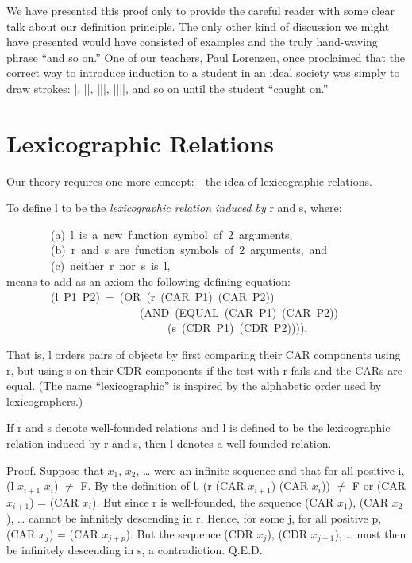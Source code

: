 \documentclass[10pt]{book}
\newenvironment{pubasis}{\begin{flushleft}}{\end{flushleft}}
\begin{document}
We have presented this proof only to provide
the careful reader with some clear talk about our
definition principle.  The only other kind
of discussion we might have presented would
have consisted of examples and the truly
hand-waving phrase ``and so on.''  One of our
teachers,  Paul Lorenzen, once proclaimed
that the correct way to introduce induction
to a student in an ideal society
was simply to draw strokes: |, ||, |||, ||||, 
and so on until the student ``caught on.''

\section{Lexicographic Relations}
\label{SSLEX}
Our theory requires one more concept:~~the
idea of lexicographic relations.

\hrulefill 

To define l to be the \emph{lexicographic relation induced by} r and s, where:
\begin{pubasis}
~~~~~~~~(a)~l~is~a~new~function~symbol~of~2~arguments,\\
~~~~~~~~(b)~r~and~s~are~function~symbols~of~2~arguments,~and\\
~~~~~~~~(c)~neither~r~nor~s~is~l,\\

means to add as an axiom the following defining equation:\\

~~~~~~~~(l~P1~P2)~=~(OR~(r~(CAR~P1)~(CAR~P2))\\
~~~~~~~~~~~~~~~~~~~~~~~~(AND~(EQUAL~(CAR~P1)~(CAR~P2))\\
~~~~~~~~~~~~~~~~~~~~~~~~~~~~~(s~(CDR~P1)~(CDR~P2)))).\\
\end{pubasis}

\hrulefill 

That is, l orders pairs of objects by first comparing 
their CAR components using r, but  using s on their CDR components
if the test with r fails and the CARs are equal.
(The name ``lexicographic'' is inspired by the alphabetic
order used by lexicographers.)

\hrulefill 

If r and s denote well-founded relations and l is defined to be
the lexicographic relation induced by r and s, then l denotes a well-founded
relation.

\hrulefill 

Proof.  Suppose that $x_{1}$, $x_{2}$, \ldots{} were an
infinite sequence and that for all positive i, (l $x_{i+1}$ $x_{i}$) $\neq$ F.
By the definition of l, (r (CAR $x_{i+1}$) (CAR $x_{i}$)) $\neq$ F
or (CAR $x_{i+1}$) = (CAR $x_{i}$).  But since r is well-founded,
the sequence (CAR $x_{1}$), (CAR $x_{2}$), \ldots{} cannot be infinitely descending
in r.
Hence, for some j, for all positive p, (CAR $x_{j}$) = (CAR $x_{j+p}$).
But the sequence (CDR $x_{j}$), (CDR $x_{j+1}$), \ldots{} must then be infinitely
descending in s, a contradiction.  Q.E.D.
\end{document}
